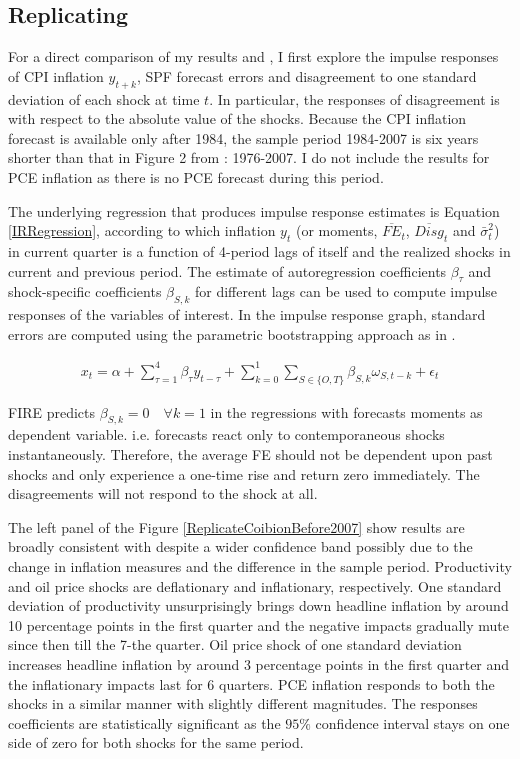 \documentclass[12pt]{article}
\begin{document}
	\subsection{Replicating \citet{coibion2012can}}
	
	For a direct comparison of my results and \citet{coibion2012can}, I first explore the impulse responses of CPI inflation $y_{t+k}$, SPF forecast errors and disagreement to one standard deviation of each shock at time $t$. In particular, the responses of disagreement is with respect to the absolute value of the shocks. Because the CPI inflation forecast is available only after 1984, the sample period 1984-2007 is six years shorter than that in Figure 2 from \citet{coibion2012can}: 1976-2007. I do not include the results for PCE inflation as there is no PCE forecast during this period. 
	
	The underlying regression that produces impulse response estimates is  Equation \ref{IRRegression}, according to which inflation $y_t$ (or moments, $\overline {FE}_{t}$, $\overline{Disg}_t$ and $\bar \sigma^2_t$) in current quarter is a function of 4-period lags of itself and the realized shocks in current and previous period. The estimate of autoregression coefficients $\beta_\tau$ and shock-specific coefficients $\beta_{S,k}$ for different lags can be used to compute impulse responses of the variables of interest. In the impulse response graph, standard errors are computed using the parametric bootstrapping approach as in \citet{coibion2012can}. 
	
	\begin{eqnarray}\label{IRRegression}
		x_{t}  = \alpha + \sum^4_{\tau=1} \beta_{\tau} y_{t-\tau} +  \sum^1_{k=0} \sum_{S \in \{O,T\}}\beta_{S,k}\omega_{S,t-k} + \epsilon_t 
	\end{eqnarray}
	
	FIRE predicts $\beta_{S,k}=0\quad \forall k=1$ in the regressions with forecasts moments as dependent variable. i.e. forecasts react only to contemporaneous shocks instantaneously. Therefore, the average FE should not be dependent upon past shocks and only experience a one-time rise and return zero immediately. The disagreements will not respond to the shock at all. 
	
	The left panel of the Figure \ref{ReplicateCoibionBefore2007} show results are broadly consistent with \citet{coibion2012can} despite a wider confidence band possibly due to the change in inflation measures and the difference in the sample period. Productivity and oil price shocks are deflationary and inflationary, respectively. One standard deviation of productivity unsurprisingly brings down headline inflation by around 10 percentage points in the first quarter and the negative impacts gradually mute since then till the 7-the quarter. Oil price shock of one standard deviation increases headline inflation by around 3 percentage points in the first quarter and the inflationary impacts last for 6 quarters. PCE inflation responds to both the shocks in a similar manner with slightly different magnitudes. The responses coefficients are statistically significant as the $95\%$ confidence interval stays on one side of zero for both shocks for the same period. 
	
\end{document}
